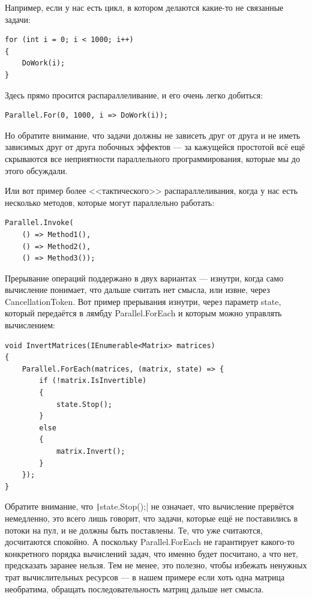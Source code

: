 \documentclass[a5paper]{article}
\begin{document}
Например, если у нас есть цикл, в котором делаются какие-то не связанные задачи:

\begin{verbatim}
for (int i = 0; i < 1000; i++) 
{
    DoWork(i);
}
\end{verbatim}

Здесь прямо просится распараллеливание, и его очень легко добиться:

\begin{verbatim}
Parallel.For(0, 1000, i => DoWork(i));
\end{verbatim}

Но обратите внимание, что задачи должны не зависеть друг от друга и не иметь зависимых друг от друга побочных эффектов --- за кажущейся простотой всё ещё скрываются все неприятности параллельного программирования, которые мы до этого обсуждали.

Или вот пример более <<тактического>> распараллеливания, когда у нас есть несколько методов, которые могут параллельно работать:

\begin{verbatim}
Parallel.Invoke(
    () => Method1(),
    () => Method2(),
    () => Method3());
\end{verbatim}

Прерывание операций поддержано в двух вариантах --- изнутри, когда само вычисление понимает, что дальше считать нет смысла, или извне, через CancellationToken. Вот пример прерывания изнутри, через параметр state, который передаётся в лямбду Parallel.ForEach и которым можно управлять вычислением:

\begin{verbatim}
void InvertMatrices(IEnumerable<Matrix> matrices)
{
    Parallel.ForEach(matrices, (matrix, state) => {
        if (!matrix.IsInvertible)
        {
            state.Stop();
        }
        else
        {
            matrix.Invert();
        }
    });
}
\end{verbatim}

Обратите внимание, что \texttt|state.Stop();| не означает, что вычисление прервётся немедленно, это всего лишь говорит, что задачи, которые ещё не поставились в потоки на пул, и не должны быть поставлены. Те, что уже считаются, досчитаются спокойно. А поскольку Parallel.ForEach не гарантирует какого-то конкретного порядка вычислений задач, что именно будет посчитано, а что нет, предсказать заранее нельзя. Тем не менее, это полезно, чтобы избежать ненужных трат вычислительных ресурсов --- в нашем примере если хоть одна матрица необратима, обращать последовательность матриц дальше нет смысла.
\end{document}

